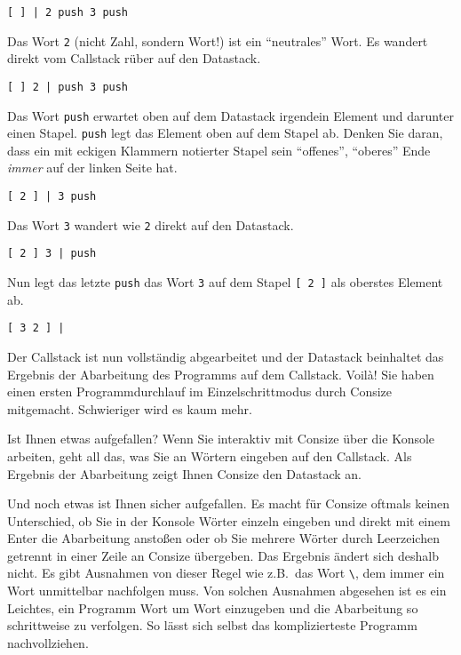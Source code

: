 \begin{verbatim}
[ ] | 2 push 3 push  
\end{verbatim}

Das Wort \verb|2| (nicht Zahl, sondern Wort!) ist ein "`neutrales"' Wort. Es wandert direkt vom Callstack rüber auf den Datastack.

\begin{verbatim}
[ ] 2 | push 3 push
\end{verbatim}

Das Wort \verb|push| erwartet oben auf dem Datastack irgendein Element und darunter einen Stapel. \verb|push| legt das Element oben auf dem Stapel ab. Denken Sie daran, dass ein mit eckigen Klammern notierter Stapel sein "`offenes"', "`oberes"' Ende \emph{immer} auf der linken Seite hat. 

\begin{verbatim}
[ 2 ] | 3 push
\end{verbatim}

Das Wort \verb|3| wandert wie \verb|2| direkt auf den Datastack.

\begin{verbatim}
[ 2 ] 3 | push
\end{verbatim}

Nun legt das letzte \verb|push| das Wort \verb|3| auf dem Stapel \verb|[ 2 ]| als oberstes Element ab.

\begin{verbatim}
[ 3 2 ] |
\end{verbatim}

Der Callstack ist nun vollständig abgearbeitet und der Datastack beinhaltet das Ergebnis der Abarbeitung des Programms auf dem Callstack. Voil\`a! Sie haben einen ersten Programmdurchlauf im Einzelschrittmodus durch Consize mitgemacht. Schwieriger wird es kaum mehr.

Ist Ihnen etwas aufgefallen? Wenn Sie interaktiv mit Consize über die Konsole arbeiten, geht all das, was Sie an Wörtern eingeben auf den Callstack. Als Ergebnis der Abarbeitung zeigt Ihnen Consize den Datastack an.

Und noch etwas ist Ihnen sicher aufgefallen. Es macht für Consize oftmals keinen Unterschied, ob Sie in der Konsole Wörter einzeln eingeben und direkt mit einem {\sc Enter} die Abarbeitung anstoßen oder ob Sie mehrere Wörter durch Leerzeichen getrennt in einer Zeile an Consize übergeben. Das Ergebnis ändert sich deshalb nicht. Es gibt Ausnahmen von dieser Regel wie z.B.\ das Wort \verb|\|, dem immer ein Wort unmittelbar nachfolgen muss. Von solchen Ausnahmen abgesehen ist es ein Leichtes, ein Programm Wort um Wort einzugeben und die Abarbeitung so schrittweise zu verfolgen. So lässt sich selbst das komplizierteste Programm nachvollziehen.


